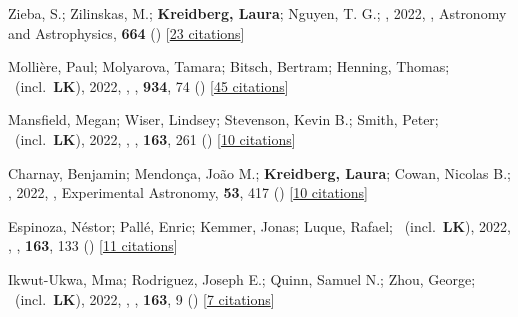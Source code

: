 \item[{\color{numcolor}\scriptsize67}] Zieba, S.; Zilinskas, M.; \textbf{Kreidberg, Laura}; Nguyen, T. G.; \etal, 2022, , Astronomy and Astrophysics, \textbf{664} () [\href{https://ui.adsabs.harvard.edu/abs/2022A&A...664A..79Z}{23 citations}]

\item[{\color{numcolor}\scriptsize66}] Molli{\`e}re, Paul; Molyarova, Tamara; Bitsch, Bertram; Henning, Thomas; \etal\ (incl.\ \textbf{LK}), 2022, , \apj, \textbf{934}, 74 () [\href{https://ui.adsabs.harvard.edu/abs/2022ApJ...934...74M}{45 citations}]

\item[{\color{numcolor}\scriptsize65}] Mansfield, Megan; Wiser, Lindsey; Stevenson, Kevin B.; Smith, Peter; \etal\ (incl.\ \textbf{LK}), 2022, , \aj, \textbf{163}, 261 () [\href{https://ui.adsabs.harvard.edu/abs/2022AJ....163..261M}{10 citations}]

\item[{\color{numcolor}\scriptsize64}] Charnay, Benjamin; Mendon{\c{c}}a, Jo{\~a}o M.; \textbf{Kreidberg, Laura}; Cowan, Nicolas B.; \etal, 2022, , Experimental Astronomy, \textbf{53}, 417 () [\href{https://ui.adsabs.harvard.edu/abs/2022ExA....53..417C}{10 citations}]

\item[{\color{numcolor}\scriptsize63}] Espinoza, N{\'e}stor; Pall{\'e}, Enric; Kemmer, Jonas; Luque, Rafael; \etal\ (incl.\ \textbf{LK}), 2022, , \aj, \textbf{163}, 133 () [\href{https://ui.adsabs.harvard.edu/abs/2022AJ....163..133E}{11 citations}]

\item[{\color{numcolor}\scriptsize62}] Ikwut-Ukwa, Mma; Rodriguez, Joseph E.; Quinn, Samuel N.; Zhou, George; \etal\ (incl.\ \textbf{LK}), 2022, , \aj, \textbf{163}, 9 () [\href{https://ui.adsabs.harvard.edu/abs/2022AJ....163....9I}{7 citations}]

